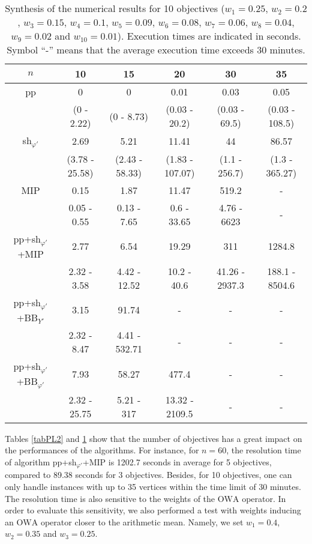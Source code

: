 \documentclass[final,3p,times]{elsarticle}
\newcommand{\owa}{\mbox{OWA}}
\begin{document}
\begin{table}[!h]
  \begin{center}
 {\small  \begin{tabular}{|c|ccccc|}
    \hline
      \rule[1pt]{0pt}{13pt} 
   $n$ & 10&15&20&30&35\\
    \hline
 pp  & 0&0&0.01&0.03&0.05\\
    	 &(0 - 2.22)&(0 - 8.73)&(0.03 - 20.2)&(0.03 - 69.5)&(0.03 - 108.5)\\
 sh$_{\varphi'}$& 2.69&5.21&11.41&44&86.57\\
    	 &(3.78 - 25.58)&(2.43 - 58.33)&(1.83 - 107.07)&(1.1 - 256.7)&(1.3 - 365.27)\\
    \hline
 MIP&0.15&1.87&11.47&519.2&-\\
    & 0.05 - 0.55&0.13 - 7.65&0.6 - 33.65&4.76 - 6623& - \\
  pp+sh$_{\varphi'}$+MIP& 2.77&6.54&19.29&311&1284.8\\
  &  2.32 - 3.58&4.42 - 12.52&10.2 - 40.6&41.26 - 2937.3&188.1 - 8504.6\\
  pp+sh$_{\varphi'}$+BB$_{Y'}$ & 3.15&91.74&-&-&-\\
  & 2.32 - 8.47&4.41 - 532.71& - & - & - \\
pp+sh$_{\varphi'}$+BB$_{\varphi'}$& 7.93&58.27&477.4&-&-\\
    & 2.32 - 25.75&5.21 - 317&13.32 - 2109.5& - & - \\
  \hline
    \end{tabular}
}
\end{center}
\caption{\label{tabPL3} Synthesis of the numerical results for 10 objectives ($w_1 = 0.25$, $w_2 = 0.2$,
  $w_3 = 0.15$, $w_4 = 0.1$, $w_5 = 0.09$, $w_6 = 0.08$, $w_7 = 0.06$,
  $w_8 = 0.04$, $w_9 = 0.02$ and $w_{10} = 0.01$). Execution times are indicated in seconds. Symbol ``-'' means that the average execution time exceeds 30 minutes.}
\end{table}

Tables \ref{tabPL2} and \ref{tabPL3} show that the number of objectives has a great impact on the performances of the algorithms. For instance, for $n = 60$, the resolution time of algorithm pp+sh$_{\varphi'}$+MIP is 1202.7 seconds in average for 5 objectives, compared to 89.38 seconds for 3 objectives. Besides, for 10 objectives, one can only handle instances with up to 35 vertices within the time limit of 30 minutes.
The resolution time is also sensitive to the weights of the $\owa$ operator. In order to evaluate this sensitivity, we also performed a test with weights inducing an $\owa$
operator closer to the arithmetic mean. Namely, we set $w_1 = 0.4$, $w_2 = 0.35$ and $w_3 = 0.25$.
\end{document}
